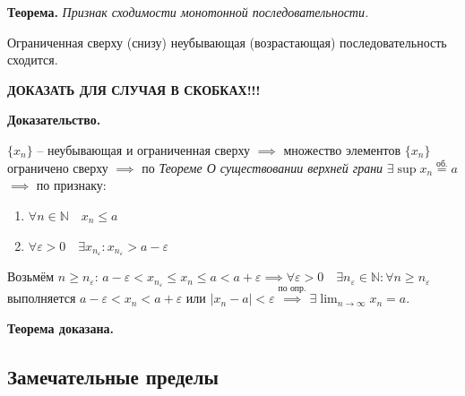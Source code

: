 \documentclass{article}
\newcommand{\bydef}{\stackrel{\text{по опр.}}{\implies}} %
\newcommand{\parspace}{\vspace{10pt}}
\newcommand{\dslim}{\displaystyle\lim}
\newcommand{\dslimn}{\dslim_{n \to \infty}}
\theoremstyle{break}
\begin{document}
\parspace

\textbf{Теорема.} \textit{Признак сходимости монотонной последовательности.}

Ограниченная сверху (снизу) неубывающая (возрастающая) последовательность сходится.

\textbf{ДОКАЗАТЬ ДЛЯ СЛУЧАЯ В СКОБКАХ!!!}

\textbf{Доказательство.}

$\{x_n\}$ -- неубывающая и ограниченная сверху $\implies$ множество элементов
$\{x_n\}$ ограничено сверху $\implies$ по
\textit{Теореме О существовании верхней грани} 
$\exists \sup x_n \stackrel{\text{об.}}{=} a$ $\implies$ по признаку:
\begin{enumerate}
    \item $\forall n \in \mathbb{N} \quad x_n \le a$
    \item $\forall \varepsilon > 0 \quad 
    \exists x_{n_\varepsilon} : x_{n_\varepsilon} > a - \varepsilon$
\end{enumerate}

Возьмём $n \ge n_\varepsilon$: 
$a - \varepsilon < x_{n_\varepsilon} \le x_n \le a < a + \varepsilon
\implies \forall \varepsilon > 0 \quad \exists n_\varepsilon \in \mathbb{N}:
\forall n \ge n_\varepsilon$ выполняется $a - \varepsilon < x_n < a + \varepsilon$
или $|x_n - a| < \varepsilon \bydef \exists \dslimn x_n = a$.

\textbf{Теорема доказана.}

\subsection{Замечательные пределы}
\end{document}
